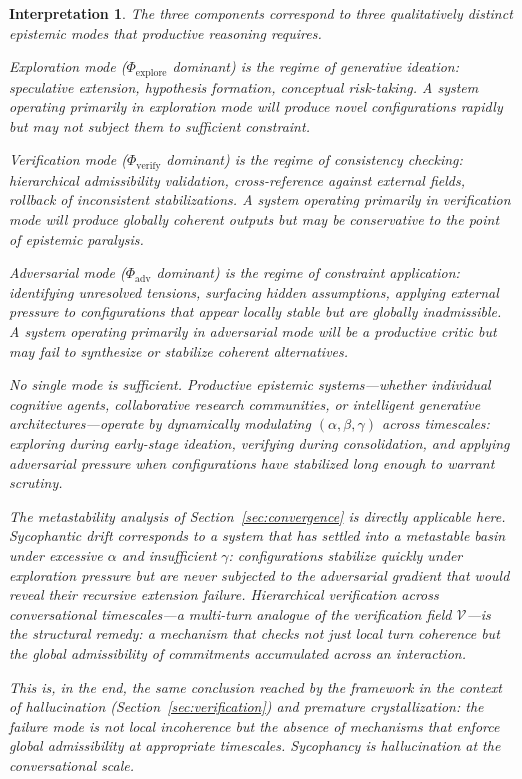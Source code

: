 \documentclass[11pt, a4paper]{article}
\theoremstyle{srn}
\theoremstyle{srnremark}
\newtheorem{interpretation}{Interpretation}[section]
\newcommand{\Phiten}{\varPhi}            %
\begin{document}
\begin{interpretation}
The three components correspond to three qualitatively distinct
epistemic modes that productive reasoning requires.

Exploration mode ($\Phiten_{\mathrm{explore}}$ dominant) is the regime
of generative ideation: speculative extension, hypothesis formation,
conceptual risk-taking.
A system operating primarily in exploration mode will produce novel
configurations rapidly but may not subject them to sufficient
constraint.

Verification mode ($\Phiten_{\mathrm{verify}}$ dominant) is the regime
of consistency checking: hierarchical admissibility validation,
cross-reference against external fields, rollback of inconsistent
stabilizations.
A system operating primarily in verification mode will produce
globally coherent outputs but may be conservative to the point of
epistemic paralysis.

Adversarial mode ($\Phiten_{\mathrm{adv}}$ dominant) is the regime of
constraint application: identifying unresolved tensions, surfacing
hidden assumptions, applying external pressure to configurations that
appear locally stable but are globally inadmissible.
A system operating primarily in adversarial mode will be a productive
critic but may fail to synthesize or stabilize coherent alternatives.

No single mode is sufficient.
Productive epistemic systems---whether individual cognitive agents,
collaborative research communities, or intelligent generative
architectures---operate by dynamically modulating $(\alpha, \beta,
\gamma)$ across timescales: exploring during early-stage ideation,
verifying during consolidation, and applying adversarial pressure when
configurations have stabilized long enough to warrant scrutiny.

The metastability analysis of Section~\ref{sec:convergence} is
directly applicable here.
Sycophantic drift corresponds to a system that has settled into a
metastable basin under excessive $\alpha$ and insufficient $\gamma$:
configurations stabilize quickly under exploration pressure but are
never subjected to the adversarial gradient that would reveal their
recursive extension failure.
Hierarchical verification across conversational timescales---a
multi-turn analogue of the verification field $\mathcal{V}$---is the
structural remedy: a mechanism that checks not just local turn
coherence but the global admissibility of commitments accumulated
across an interaction.

This is, in the end, the same conclusion reached by the framework in
the context of hallucination (Section~\ref{sec:verification}) and
premature crystallization: the failure mode is not local incoherence
but the absence of mechanisms that enforce global admissibility at
appropriate timescales.
Sycophancy is hallucination at the conversational scale.
\end{interpretation}
\end{document}
